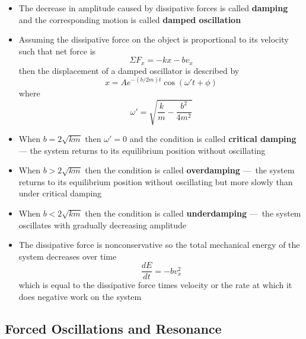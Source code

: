 \documentclass{article}
\begin{document}
\begin{itemize}
  \item The decrease in amplitude caused by dissipative forces is called \textbf{damping} and the corresponding motion is called \textbf{damped oscillation}

  \item Assuming the dissipative force on the object is proportional to its velocity such that net force is \[\Sigma F_x = -kx -bv_x\] then the displacement of a damped oscillator is described by \[x = Ae^{-(b/2m)t}\cos(\omega't + \phi)\] where \[\omega' = \sqrt{\frac{k}{m} - \frac{b^2}{4m^2}}\]

  \item When $b = 2\sqrt{km}$ then $\omega'=0$ and the condition is called \textbf{critical damping} — the system returns to its equilibrium position without oscillating

  \item When $b > 2\sqrt{km}$ then the condition is called \textbf{overdamping} — the system returns to its equilibrium position without oscillating but more slowly than under critical damping

  \item When $b < 2\sqrt{km}$ then the condition is called \textbf{underdamping} — the system oscillates with gradually decreasing amplitude

  \item The dissipative force is nonconservative so the total mechanical energy of the system decreases over time \[\frac{dE}{dt} = -bv_x^2\] which is equal to the dissipative force times velocity or the rate at which it does negative work on the system
\end{itemize}

\subsection{Forced Oscillations and Resonance}
\end{document}
